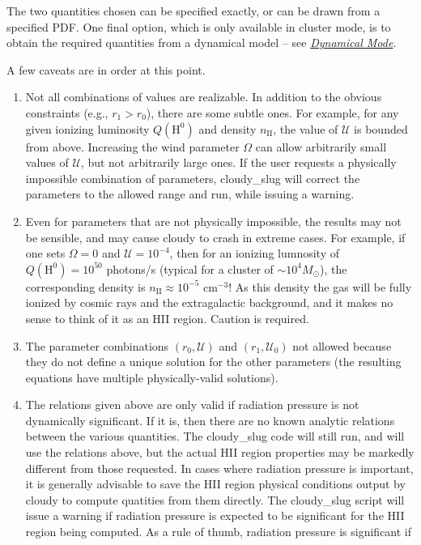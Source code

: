 \documentclass[letterpaper,10pt,english]{sphinxmanual}
\begin{document}
The two quantities chosen can be specified exactly, or can be drawn
from a specified PDF. One final option, which is only available in
cluster mode, is to obtain the required quantities from a dynamical
model -- see {\hyperref[cloudy:sssec\string-cloudy\string-dynamical\string-cluster\string-mode]{\emph{Dynamical Mode}}}.

A few caveats are in order at this point.
\begin{enumerate}
\item {} 
Not all combinations of values are realizable. In addition to the
obvious constraints (e.g., \(r_1 > r_0\)), there are some
subtle ones. For example, for any given ionizing luminosity
\(Q(\mathrm{H}^0)\) and density \(n_{\mathrm{II}}\), the
value of \(\mathcal{U}\) is bounded from above. Increasing the
wind parameter \(\Omega\) can allow arbitrarily small values of
\(\mathcal{U}\), but not arbitrarily large ones. If the user
requests a physically impossible combination of parameters,
cloudy\_slug will correct the parameters to the allowed range and
run, while issuing a warning.

\item {} 
Even for parameters that are not physically impossible, the results
may not be sensible, and may cause cloudy to crash in extreme
cases. For example, if one sets \(\Omega = 0\) and
\(\mathcal{U} = 10^{-4}\), then for an ionizing lumnosity of
\(Q(\mathrm{H}^0) = 10^{50}\) photons/s (typical for a cluster
of \(\sim 10^4M_\odot\)), the corresponding density is
\(n_{\mathrm{II}} \approx 10^{-5}\mbox{ cm}^{-3}\)! As this
density the gas will be fully ionized by cosmic rays and the
extragalactic background, and it makes no sense to think of it as
an HII region. Caution is required.

\item {} 
The parameter combinations \((r_0,\mathcal{U})\) and
\((r_1,\mathcal{U}_0)\) not allowed
because they do not define a unique solution for the other
parameters (the resulting equations have multiple physically-valid
solutions).

\item {} 
The relations given above are only valid if radiation pressure is
not dynamically significant. If it is, then there are no known
analytic relations between the various quantities. The cloudy\_slug
code will still run, and will use the relations above, but the
actual HII region properties may be markedly different from those
requested. In cases where radiation pressure is important, it is
generally advisable to save the HII region physical conditions
output by cloudy to compute quatities from them directly. The
cloudy\_slug script will issue a warning if radiation pressure is
expected to be significant for the HII region being computed. As a rule
of thumb, radiation pressure is significant if

\end{enumerate}
\end{document}
